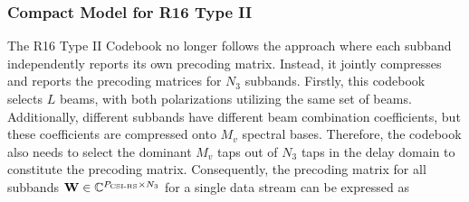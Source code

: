 \documentclass[lettersize,journal]{IEEEtran}
\begin{document}
\subsubsection{Compact Model for R16 Type II}
The R16 Type II Codebook no longer follows the approach where each subband independently reports its own precoding matrix. Instead, it jointly compresses and reports the precoding matrices for \( N_3 \) subbands. Firstly, this codebook selects \( L \) beams, with both polarizations utilizing the same set of beams. Additionally, different subbands have different beam combination coefficients, but these coefficients are compressed onto \( M_v \) spectral bases. Therefore, the codebook also needs to select the dominant \( M_v \) taps out of \( N_3 \) taps in the delay domain to constitute the precoding matrix. Consequently, the precoding matrix for all subbands \( {\bf{W}} \in \mathbb{C}^{{P_{{\text{CSI-RS}}}}\times N_3} \) for a single data stream can be expressed as
\end{document}
